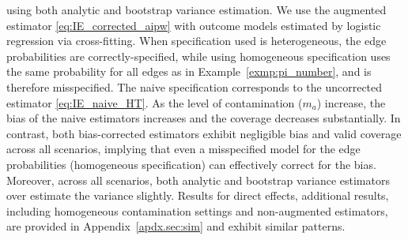 \documentclass[11pt]{article}
\theoremstyle{definition}
\begin{document}
 using both analytic and bootstrap variance estimation.
We use the augmented estimator \eqref{eq:IE_corrected_aipw}
with outcome models estimated by logistic regression via cross-fitting.
When specification used is heterogeneous, the 
edge probabilities are correctly-specified, while using homogeneous specification
uses the same probability for all edges as in Example~\ref{exmp:pi_number}, 
and is therefore misspecified.
The naive specification corresponds to the uncorrected estimator \eqref{eq:IE_naive_HT}.
As the level of contamination ($m_a$) increase,
the bias of the naive estimators increases and the coverage decreases substantially.
In contrast, both bias-corrected estimators
exhibit negligible bias and valid coverage across all scenarios,
implying that even a misspecified model for the edge probabilities
(homogeneous specification) can effectively correct for the bias.
Moreover, across all scenarios, both analytic and bootstrap variance estimators
over estimate the variance slightly.  
Results for direct effects, additional results,
 including homogeneous contamination settings and non-augmented estimators,
are provided in Appendix~\ref{apdx.sec:sim} and exhibit similar patterns.
    
\end{document}
